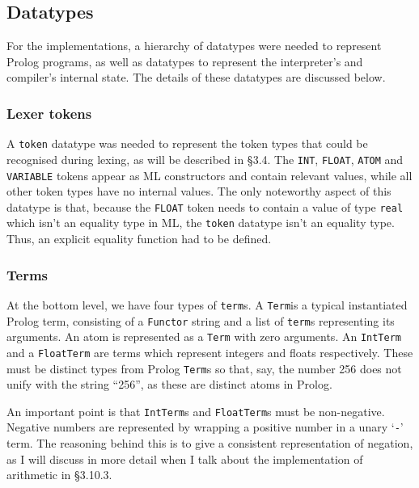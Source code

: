 \documentclass[12pt]{article}
\begin{document}

\subsection{Datatypes}

For the implementations, a hierarchy of datatypes were needed to represent Prolog programs, as well as datatypes to represent the interpreter's and compiler's internal state. The details of these datatypes are discussed below.

\subsubsection{Lexer tokens}

A \verb|token| datatype was needed to represent the token types that could be recognised during lexing, as will be described in \S3.4. 
The \verb|INT|, \verb|FLOAT|, \verb|ATOM| and \verb|VARIABLE| tokens appear as ML constructors and contain relevant values, while all other token types have no internal values. 
The only noteworthy aspect of this datatype is that, because the \verb|FLOAT| token needs to contain a value of type \verb|real| which isn't an equality type in ML, the \verb|token| datatype isn't an equality type. 
Thus, an explicit equality function had to be defined.

\subsubsection{Terms}

At the bottom level, we have four types of \verb|term|s. 
A \verb|Term|\footnotemark[1] is a typical instantiated Prolog term, consisting of a \verb|Functor| string and a list of \verb|term|s representing its arguments. 
An atom is represented as a \verb|Term| with zero arguments.
An \verb|IntTerm| and a \verb|FloatTerm| are terms which represent integers and floats respectively. 
These must be distinct types from Prolog \verb|Term|s so that, say, the number 256 does not unify with the string ``256'', as these are distinct atoms in Prolog.


An important point is that \verb|IntTerm|s and \verb|FloatTerm|s must be non-negative. 
Negative numbers are represented by wrapping a positive number in a unary `\verb|-|' term. 
The reasoning behind this is to give a consistent representation of negation, as I will discuss in more detail when I talk about the implementation of arithmetic in \S3.10.3.
\end{document}
